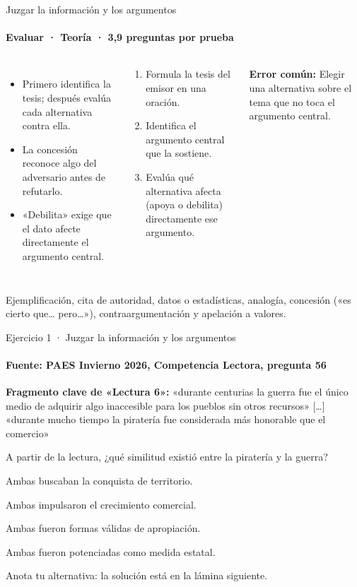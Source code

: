\documentclass[aspectratio=169,11pt]{beamer}
\newcommand{\alternativa}[2]{\begin{opcion}\tecla{#1}\hspace{0.6em}#2\end{opcion}}
\newlength{\ajustealto}
\newenvironment{ajustar}[1][0.74\textheight]
  {\setlength{\ajustealto}{#1}\begin{lrbox}{\ajustecaja}\begin{minipage}{\textwidth}}
  {\end{minipage}\end{lrbox}%
   \ifdim\dimexpr\ht\ajustecaja+\dp\ajustecaja\relax>\ajustealto
     \resizebox*{!}{\ajustealto}{\usebox{\ajustecaja}}\else\usebox{\ajustecaja}\fi}
\begin{document}
\begin{frame}{Juzgar la información y los argumentos}
\label{tema-cl-argumentos}
\framesubtitle{Evaluar · Teoría · 3,9 preguntas por prueba}
\begin{ajustar}
\begin{columns}[T,onlytextwidth]
\begin{itemize}\footnotesize
\item Primero identifica la tesis; después evalúa cada alternativa contra ella.
\item La concesión reconoce algo del adversario antes de refutarlo.
\item «Debilita» exige que el dato afecte directamente el argumento central.
\end{itemize}
\begin{cajaregla}\scriptsize \begin{enumerate}\item Formula la tesis del emisor en una oración.\item Identifica el argumento central que la sostiene.\item Evalúa qué alternativa afecta (apoya o debilita) directamente ese argumento.\end{enumerate}\end{cajaregla}
\begin{notagris}\scriptsize \textbf{Error común:} Elegir una alternativa sobre el tema que no toca el argumento central.\end{notagris}
\end{columns}
\begin{cajaclave}\footnotesize
Ejemplificación, cita de autoridad, datos o estadísticas, analogía, concesión («es cierto que\ldots{} pero\ldots{}»), contraargumentación y apelación a valores.
\end{cajaclave}
\end{ajustar}
\end{frame}

\begin{frame}{Ejercicio 1 · Juzgar la información y los argumentos}
\framesubtitle{Fuente: PAES Invierno 2026, Competencia Lectora, pregunta 56}
\begin{ajustar}[0.7\textheight]
\begin{notagris}\scriptsize \textbf{Fragmento clave de «Lectura 6»:} «durante centurias la guerra fue el único medio de adquirir algo inaccesible para los pueblos sin otros recursos» [\ldots] «durante mucho tiempo la piratería fue considerada más honorable que el comercio»\end{notagris}
{\small A partir de la lectura, ¿qué similitud existió entre la piratería y la guerra?}
\vspace{0.4em}
\alternativa{A}{Ambas buscaban la conquista de territorio.}
\alternativa{B}{Ambas impulsaron el crecimiento comercial.}
\alternativa{C}{Ambas fueron formas válidas de apropiación.}
\alternativa{D}{Ambas fueron potenciadas como medida estatal.}
\end{ajustar}
\vfill{\tiny\color{zinc500}\hfill Anota tu alternativa: la solución está en la lámina siguiente.}
\end{frame}
\end{document}
